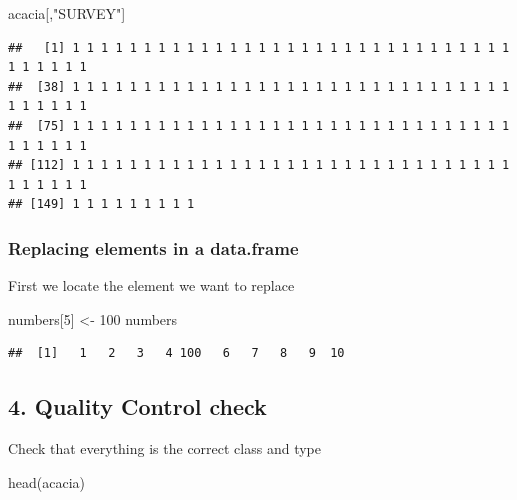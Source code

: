 \documentclass[
]{article}
\newenvironment{Shaded}{\begin{snugshade}}{\end{snugshade}}
\newcommand{\DecValTok}[1]{\textcolor[rgb]{0.00,0.00,0.81}{#1}}
\newcommand{\FunctionTok}[1]{\textcolor[rgb]{0.00,0.00,0.00}{#1}}
\newcommand{\NormalTok}[1]{#1}
\newcommand{\OtherTok}[1]{\textcolor[rgb]{0.56,0.35,0.01}{#1}}
\newcommand{\StringTok}[1]{\textcolor[rgb]{0.31,0.60,0.02}{#1}}
\begin{document}
\begin{Shaded}
\begin{Highlighting}[]
\NormalTok{acacia[,}\StringTok{"SURVEY"}\NormalTok{]}
\end{Highlighting}
\end{Shaded}

\begin{verbatim}
##   [1] 1 1 1 1 1 1 1 1 1 1 1 1 1 1 1 1 1 1 1 1 1 1 1 1 1 1 1 1 1 1 1 1 1 1 1 1 1
##  [38] 1 1 1 1 1 1 1 1 1 1 1 1 1 1 1 1 1 1 1 1 1 1 1 1 1 1 1 1 1 1 1 1 1 1 1 1 1
##  [75] 1 1 1 1 1 1 1 1 1 1 1 1 1 1 1 1 1 1 1 1 1 1 1 1 1 1 1 1 1 1 1 1 1 1 1 1 1
## [112] 1 1 1 1 1 1 1 1 1 1 1 1 1 1 1 1 1 1 1 1 1 1 1 1 1 1 1 1 1 1 1 1 1 1 1 1 1
## [149] 1 1 1 1 1 1 1 1 1
\end{verbatim}

\hypertarget{replacing-elements-in-a-data.frame}{%
\subsubsection{Replacing elements in a
data.frame}\label{replacing-elements-in-a-data.frame}}

First we locate the element we want to replace

\begin{Shaded}
\begin{Highlighting}[]
\NormalTok{numbers[}\DecValTok{5}\NormalTok{] }\OtherTok{\textless{}{-}} \DecValTok{100}
\NormalTok{numbers}
\end{Highlighting}
\end{Shaded}

\begin{verbatim}
##  [1]   1   2   3   4 100   6   7   8   9  10
\end{verbatim}

\hypertarget{quality-control-check}{%
\subsection{4. Quality Control check}\label{quality-control-check}}

Check that everything is the correct class and type

\begin{Shaded}
\begin{Highlighting}[]
\FunctionTok{head}\NormalTok{(acacia)}
\end{Highlighting}
\end{Shaded}
\end{document}
